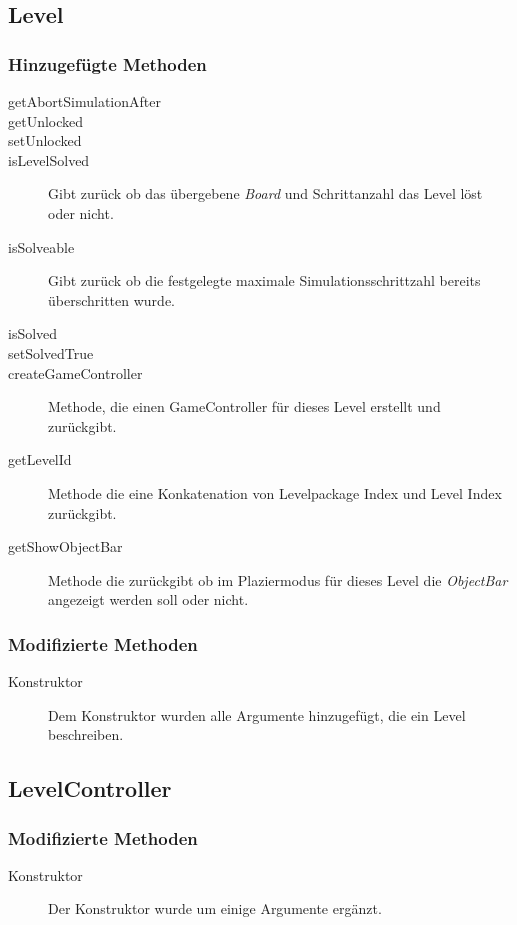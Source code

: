 \subsection{Level}

	\subsubsection{Hinzugefügte Methoden}
		\begin{description}
			\item[getAbortSimulationAfter]
			\item[getUnlocked]
			\item[setUnlocked]
			\item[isLevelSolved] Gibt zurück ob das übergebene \emph{Board} und Schrittanzahl 
				das Level löst oder nicht.
			\item[isSolveable] Gibt zurück ob die festgelegte maximale Simulationsschrittzahl bereits 
				überschritten wurde.
			\item[isSolved]
			\item[setSolvedTrue]
			\item[createGameController] Methode, die einen GameController für dieses Level erstellt und zurückgibt.
			\item[getLevelId] Methode die eine Konkatenation von Levelpackage Index und Level Index zurückgibt.
			\item[getShowObjectBar] Methode die zurückgibt ob im Plaziermodus für dieses Level die \emph{ObjectBar} 
				angezeigt werden soll oder nicht.
		\end{description}
	\subsubsection{Modifizierte Methoden}
		\begin{description}
			\item[Konstruktor] Dem Konstruktor wurden alle Argumente hinzugefügt, die ein Level beschreiben.
		\end{description}

\subsection{LevelController}

	\subsubsection{Modifizierte Methoden}
		\begin{description}
			\item[Konstruktor] Der Konstruktor wurde um einige Argumente ergänzt.
		\end{description}
